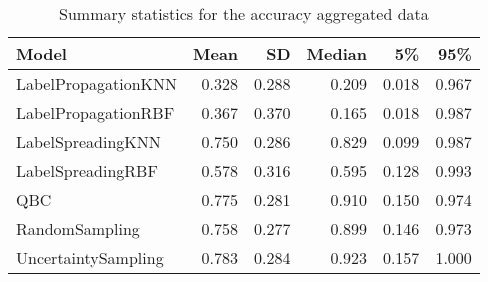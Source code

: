\begin{table}[!h]

\caption{\label{tab:summarystatisticstable}Summary statistics for the accuracy aggregated data}
\centering
\begin{tabular}[t]{lrrrrr}
\toprule
Model & Mean & SD & Median & 5\% & 95\%\\
\midrule
LabelPropagationKNN & 0.328 & 0.288 & 0.209 & 0.018 & 0.967\\
LabelPropagationRBF & 0.367 & 0.370 & 0.165 & 0.018 & 0.987\\
LabelSpreadingKNN & 0.750 & 0.286 & 0.829 & 0.099 & 0.987\\
LabelSpreadingRBF & 0.578 & 0.316 & 0.595 & 0.128 & 0.993\\
QBC & 0.775 & 0.281 & 0.910 & 0.150 & 0.974\\
RandomSampling & 0.758 & 0.277 & 0.899 & 0.146 & 0.973\\
UncertaintySampling & 0.783 & 0.284 & 0.923 & 0.157 & 1.000\\
\bottomrule
\end{tabular}
\end{table}
